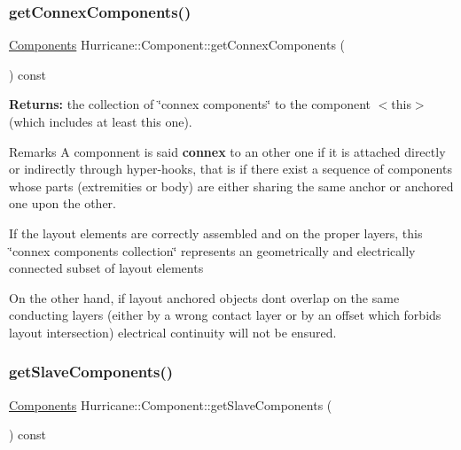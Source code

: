 \subsubsection{\texorpdfstring{get\+Connex\+Components()}{getConnexComponents()}}
{\footnotesize\ttfamily \mbox{\hyperlink{namespaceHurricane_a7d26d99aeb5dd6d70d51bd35d2473e72}{Components}} Hurricane\+::\+Component\+::get\+Connex\+Components (\begin{DoxyParamCaption}{ }\end{DoxyParamCaption}) const}

{\bfseries Returns\+:} the collection of \char`\"{}connex components\char`\"{} to the component {\ttfamily $<$this$>$} (which includes at least this one).

\begin{DoxyRemark}{Remarks}
A componnent is said {\bfseries connex} to an other one if it is attached directly or indirectly through hyper-\/hooks, that is if there exist a sequence of components whose parts (extremities or body) are either sharing the same anchor or anchored one upon the other.
\end{DoxyRemark}
If the layout elements are correctly assembled and on the proper layers, this \char`\"{}connex components collection\char`\"{} represents an geometrically and electrically connected subset of layout elements

On the other hand, if layout anchored objects don\textquotesingle{}t overlap on the same conducting layers (either by a wrong contact layer or by an offset which forbids layout intersection) electrical continuity will not be ensured. \mbox{\label{classHurricane_1_1Component_af6d6b7c6b3cb18754cfa02bc5fb1e754}} 
\subsubsection{\texorpdfstring{get\+Slave\+Components()}{getSlaveComponents()}}
{\footnotesize\ttfamily \mbox{\hyperlink{namespaceHurricane_a7d26d99aeb5dd6d70d51bd35d2473e72}{Components}} Hurricane\+::\+Component\+::get\+Slave\+Components (\begin{DoxyParamCaption}{ }\end{DoxyParamCaption}) const}

